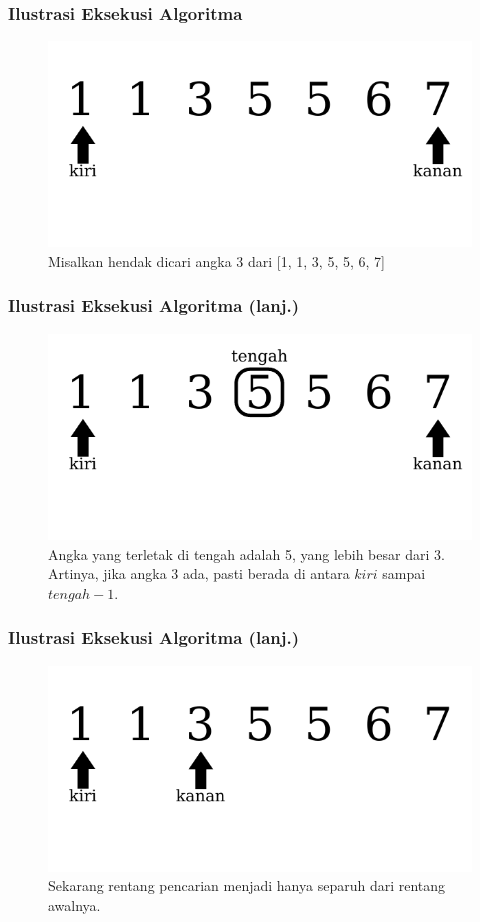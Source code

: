 \begin{frame}
\frametitle{Ilustrasi Eksekusi Algoritma}
  \begin{figure}
    \vspace*{-0.32cm}
    \includegraphics{asset/BS-1.pdf}
    \caption{Misalkan hendak dicari angka 3 dari [1, 1, 3, 5, 5, 6, 7]}
  \end{figure}
\end{frame}

\begin{frame}
\frametitle{Ilustrasi Eksekusi Algoritma (lanj.)}
  \begin{figure}
    \includegraphics{asset/BS-2.pdf}
    \caption{Angka yang terletak di tengah adalah 5, yang lebih besar dari 3. Artinya, jika angka 3 ada, pasti berada di antara $kiri$ sampai $tengah-1$.}
  \end{figure}
\end{frame}

\begin{frame}
\frametitle{Ilustrasi Eksekusi Algoritma (lanj.)}
  \begin{figure}
    \vspace*{-0.32cm}
    \includegraphics{asset/BS-3.pdf}
    \caption{Sekarang rentang pencarian menjadi hanya separuh dari rentang awalnya.}
  \end{figure}
\end{frame}


